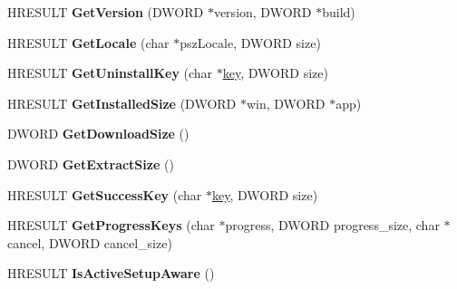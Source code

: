 \begin{DoxyCompactItemize}
\item 
\mbox{\label{interface_i_cif_component_a9719de2b96ffd9559a2ef093300ff8f4}} 
H\+R\+E\+S\+U\+LT {\bfseries Get\+Version} (D\+W\+O\+RD $\ast$version, D\+W\+O\+RD $\ast$build)
\item 
\mbox{\label{interface_i_cif_component_ac4ba92942324b0f8a14addd2fa2792ae}} 
H\+R\+E\+S\+U\+LT {\bfseries Get\+Locale} (char $\ast$psz\+Locale, D\+W\+O\+RD size)
\item 
\mbox{\label{interface_i_cif_component_a6e8468e55f9caeb52a44dabba316c286}} 
H\+R\+E\+S\+U\+LT {\bfseries Get\+Uninstall\+Key} (char $\ast$\hyperlink{structkey}{key}, D\+W\+O\+RD size)
\item 
\mbox{\label{interface_i_cif_component_adf9c4b6b193c3951ef46da1ef305b9f3}} 
H\+R\+E\+S\+U\+LT {\bfseries Get\+Installed\+Size} (D\+W\+O\+RD $\ast$win, D\+W\+O\+RD $\ast$app)
\item 
\mbox{\label{interface_i_cif_component_a87a921af2f1f6bd3ed7cae4bfafa25fb}} 
D\+W\+O\+RD {\bfseries Get\+Download\+Size} ()
\item 
\mbox{\label{interface_i_cif_component_a95c70d463db5d4b365456ba6d6487bd0}} 
D\+W\+O\+RD {\bfseries Get\+Extract\+Size} ()
\item 
\mbox{\label{interface_i_cif_component_a8947bb2976562e45f203327ad5760458}} 
H\+R\+E\+S\+U\+LT {\bfseries Get\+Success\+Key} (char $\ast$\hyperlink{structkey}{key}, D\+W\+O\+RD size)
\item 
\mbox{\label{interface_i_cif_component_a6206d333409b47f4e67c677ac96f5026}} 
H\+R\+E\+S\+U\+LT {\bfseries Get\+Progress\+Keys} (char $\ast$progress, D\+W\+O\+RD progress\+\_\+size, char $\ast$cancel, D\+W\+O\+RD cancel\+\_\+size)
\item 
\mbox{\label{interface_i_cif_component_a6559e77996916110ed9d3547a963c697}} 
H\+R\+E\+S\+U\+LT {\bfseries Is\+Active\+Setup\+Aware} ()
\item 

\end{DoxyCompactItemize}
